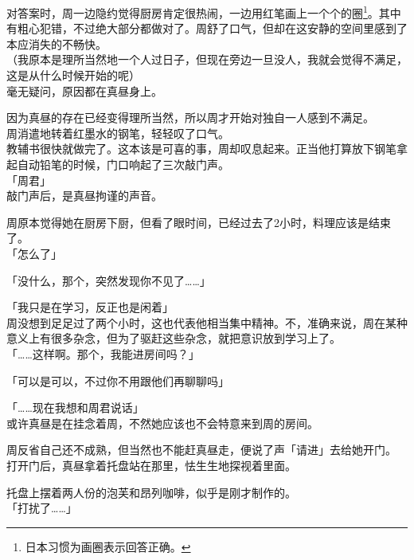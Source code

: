 对答案时，周一边隐约觉得厨房肯定很热闹，一边用红笔画上一个个的圈\footnote{日本习惯为画圈表示回答正确。}。其中有粗心犯错，不过绝大部分都做对了。周舒了口气，但却在这安静的空间里感到了本应消失的不畅快。\\

（我原本是理所当然地一个人过日子，但现在旁边一旦没人，我就会觉得不满足，这是从什么时候开始的呢）\\

毫无疑问，原因都在真昼身上。

因为真昼的存在已经变得理所当然，所以周才开始对独自一人感到不满足。\\

周消遣地转着红墨水的钢笔，轻轻叹了口气。\\

教辅书很快就做完了。这本该是可喜的事，周却叹息起来。正当他打算放下钢笔拿起自动铅笔的时候，门口响起了三次敲门声。\\

「周君」\\

敲门声后，是真昼拘谨的声音。

周原本觉得她在厨房下厨，但看了眼时间，已经过去了2小时，料理应该是结束了。\\

「怎么了」

「没什么，那个，突然发现你不见了……」

「我只是在学习，反正也是闲着」\\

周没想到足足过了两个小时，这也代表他相当集中精神。不，准确来说，周在某种意义上有很多杂念，但为了驱赶这些杂念，就把意识放到学习上了。\\

「……这样啊。那个，我能进房间吗？」

「可以是可以，不过你不用跟他们再聊聊吗」

「……现在我想和周君说话」\\

或许真昼是在挂念着周，不然她应该也不会特意来到周的房间。

周反省自己还不成熟，但当然也不能赶真昼走，便说了声「请进」去给她开门。\\

打开门后，真昼拿着托盘站在那里，怯生生地探视着里面。

托盘上摆着两人份的泡芙和昂列咖啡，似乎是刚才制作的。\\

「打扰了……」\\

